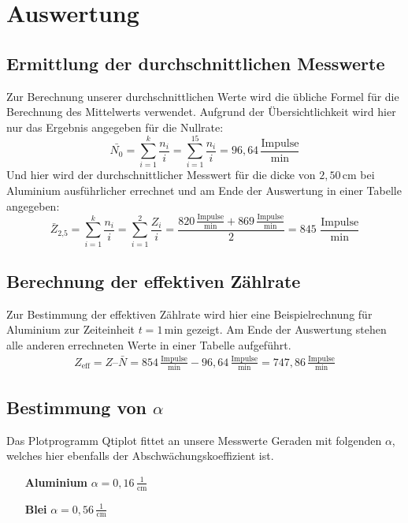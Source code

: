 \documentclass[fontsize=12pt]{scrartcl}
\begin{document}
\section{ Auswertung}

\subsection{Ermittlung der durchschnittlichen Messwerte}

Zur Berechnung unserer durchschnittlichen Werte wird die übliche Formel für die Berechnung des Mittelwerts verwendet. Aufgrund der Übersichtlichkeit wird hier nur das Ergebnis angegeben für die Nullrate:\\
\begin{equation*}
\bar{N_0}=\sum_{i=1}^k \frac{n_i}{i} = \sum_{i=1}^{15} \frac{n_i}{i} = 96,64\,\frac{\text{Impulse}}{\text{min}}
\end{equation*}
\noindent
Und hier wird der durchschnittlicher Messwert für die dicke von $2,50$\,cm bei Aluminium ausführlicher errechnet und am Ende der Auswertung in einer Tabelle angegeben:
\begin{equation*}
\bar{Z}_{\text{2,5}}=\sum_{i=1}^k \frac{n_i}{i} = \sum_{i=1}^{2} \frac{Z_i}{i} = \frac{820\,\frac{\text{Impulse}}{\text{min}}+869\,\frac{\text{Impulse}}{\text{min}}}{2} = 845\,\,\frac{\text{Impulse}}{\text{min}}
\end{equation*}
\subsection{Berechnung der effektiven Zählrate}
Zur Bestimmung der effektiven Zählrate wird hier eine Beispielrechnung für Aluminium zur Zeiteinheit $t=1$\,min gezeigt. Am Ende der Auswertung stehen alle anderen errechneten Werte in einer Tabelle aufgeführt.
\begin{align*}
Z_{\text{eff}} = Z – \bar{N}= 854\,\frac{\text{Impulse}}{\text{min}}-96,64\,\frac{\text{Impulse}}{\text{min}} =747,86\,\frac{\text{Impulse}}{\text{min}}
\end{align*}
\noindent
\subsection{Bestimmung von $\alpha$}
Das Plotprogramm Qtiplot fittet an unsere Messwerte Geraden mit folgenden $\alpha$, welches hier ebenfalls der Abschwächungskoeffizient ist.
\begin{itemize}
\centering
\item[\textbf{Aluminium}] $\alpha=0,16\,\frac{1}{\text{cm}}$
\item[\textbf{Blei}] $\alpha=0,56\,\frac{1}{\text{cm}}$
\end{itemize}
\end{document}
